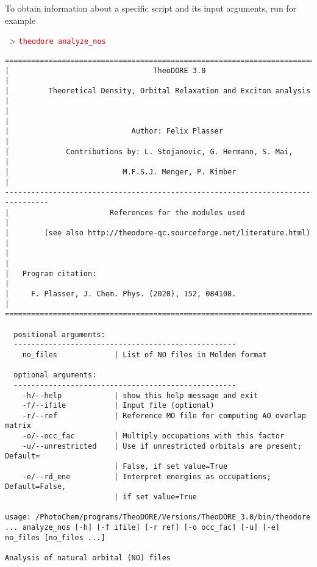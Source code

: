 \documentclass[DIV=12,headings=normal]{scrartcl}
\newcommand{\redl}[1]{{\textcolor{red}{\texttt{#1}}}}
\newcommand{\comm}[1]{
\small
~> \redl{#1}
\normalsize
}
\begin{document}
To obtain information about a specific script and its input arguments, run for example

\comm{theodore analyze\_nos}

\scriptsize
\begin{Verbatim}[commandchars=\\\{\}]
================================================================================
|                                 TheoDORE 3.0                                 |
|         Theoretical Density, Orbital Relaxation and Exciton analysis         |
|                                                                              |
|                            Author: Felix Plasser                             |
|             Contributions by: L. Stojanovic, G. Hermann, S. Mai,             |
|                          M.F.S.J. Menger, P. Kimber                          |
--------------------------------------------------------------------------------
|                       References for the modules used                        |
|        (see also http://theodore-qc.sourceforge.net/literature.html)         |
|                                                                              |
|   Program citation:                                                          |
|     F. Plasser, J. Chem. Phys. (2020), 152, 084108.                          |
================================================================================

  positional arguments:
  ---------------------------------------------------
    no_files             | List of NO files in Molden format                 

  optional arguments:
  ---------------------------------------------------
    -h/--help            | show this help message and exit                   
    -f/--ifile           | Input file (optional)                             
    -r/--ref             | Reference MO file for computing AO overlap matrix 
    -o/--occ_fac         | Multiply occupations with this factor             
    -u/--unrestricted    | Use if unrestricted orbitals are present; Default=
                         | False, if set value=True                          
    -e/--rd_ene          | Interpret energies as occupations; Default=False, 
                         | if set value=True                                 

usage: /PhotoChem/programs/TheoDORE/Versions/TheoDORE_3.0/bin/theodore ... analyze_nos [-h] [-f ifile] [-r ref] [-o occ_fac] [-u] [-e] no_files [no_files ...] 

Analysis of natural orbital (NO) files
\end{Verbatim}
\normalsize
\end{document}
